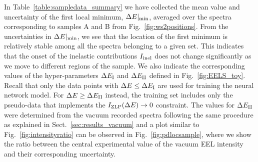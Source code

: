 In Table~\ref{table:sampledata_summary} we have collected the mean value 
and uncertainty of the first local minimum, $\Delta E|_{\rm min}$,
averaged over the spectra corresponding to samples A and B from
Fig.~\ref{fig:ws2positions}.
%
From the uncertainties in $\Delta E|_{\rm min}$, we see that the
location of the first minimum is relatively stable
among all the spectra belonging to a given set.
%
This indicates that the onset of the inelastic contributions $I_{\rm inel}$ does
not change significantly as we move to different regions of the sample.
%
We also indicate
the corresponding values of the hyper-parameters
$\Delta E_{\rm I}$ and $\Delta E_{\rm II}$ defined in Fig.~\ref{fig:EELS_toy}.
%
Recall that only
the data points with $\Delta E \le \Delta E_{\rm I}$ are used for training
the neural network model.
%
For $\Delta E \ge \Delta E_{\rm II}$ instead, the training set includes only the pseudo-data
that implements the $I_{\rm ZLP}(\Delta E)\to 0$ constraint.
%
The values for $\Delta E_{\rm II}$ were determined from the vacuum recorded spectra
following the same procedure as explained 
in Sect.~\ref{sec:results_vacuum} and a plot similar to Fig.~\ref{fig:intensityratio} 
can be observed in  Fig.~\ref{fig:pdlocsample}, where we show the ratio between the central
experimental value of the vacuum EEL intensity and their corresponding uncertainty.
%
